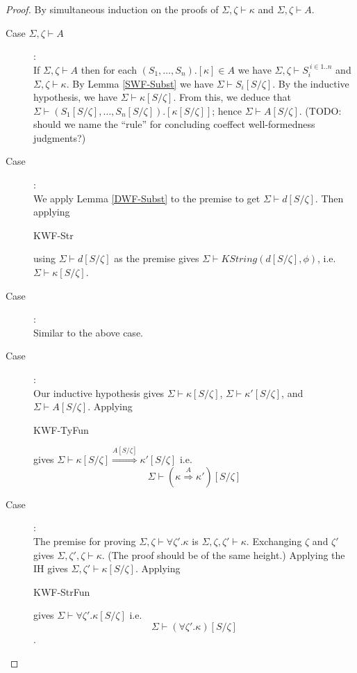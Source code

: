 \documentclass{article}
\begin{document}
\begin{proof}
By simultaneous induction on the proofs of $\Sigma,\zeta \vdash \kappa$ and $\Sigma,\zeta \vdash A$. 

\begin{description}
\item[Case $\Sigma,\zeta \vdash A$]:~\\
If $\Sigma,\zeta \vdash A$ then for each $(S_1,\ldots,S_n).[\kappa] \in A$ we 
have $\Sigma,\zeta \vdash S_i^{~i \in 1..n}$ and $\Sigma,\zeta \vdash \kappa$. By Lemma \ref{SWF-Subst} we have
$\Sigma \vdash S_i[S/\zeta]$. By the inductive hypothesis, we have $\Sigma \vdash \kappa[S/\zeta]$. From this,
we deduce that $\Sigma \vdash (S_1[S/\zeta],\ldots,S_n[S/\zeta]).[\kappa[S/\zeta]]$; hence $\Sigma \vdash A[S/\zeta]$. (TODO: should we name the ``rule'' for concluding coeffect well-formedness judgments?)
\item[Case ]:~\\
We apply Lemma \ref{DWF-Subst} to the premise to get $\Sigma \vdash d[S/\zeta]$. Then applying 
\begin{sc}KWF-Str\end{sc} using $\Sigma \vdash d[S/\zeta]$ as the premise gives 
$\Sigma \vdash \mathit{KString}(d[S/\zeta],\phi)$, i.e. $\Sigma \vdash \kappa[S/\zeta]$.

\item[Case ]:~\\
Similar to the above case.

\item[Case ]:~\\
Our inductive hypothesis gives $\Sigma \vdash \kappa[S/\zeta]$, $\Sigma \vdash \kappa'[S/\zeta]$, and
$\Sigma \vdash A[S/\zeta]$. Applying \begin{sc}KWF-TyFun\end{sc} gives $\Sigma \vdash \kappa[S/\zeta] \overset{A[S/\zeta]}{\Rightarrow} \kappa'[S/\zeta]$ i.e. $$\Sigma \vdash (\kappa \overset{A}{\Rightarrow} \kappa')[S/\zeta]$$

\item[Case ]:~\\
The premise for proving $\Sigma,\zeta \vdash \forall \zeta'.\kappa$ is $\Sigma,\zeta,\zeta' \vdash \kappa$. Exchanging $\zeta$ and $\zeta'$ gives $\Sigma,\zeta',\zeta \vdash \kappa$. (The proof should be of the same height.) Applying the IH gives $\Sigma,\zeta' \vdash \kappa[S/\zeta]$. Applying \begin{sc}KWF-StrFun\end{sc} gives $\Sigma \vdash \forall \zeta'. \kappa[S/\zeta]$ i.e.
$$\Sigma \vdash (\forall \zeta'. \kappa)[S/\zeta]$$.
\end{description}
\end{proof}
\end{document}

